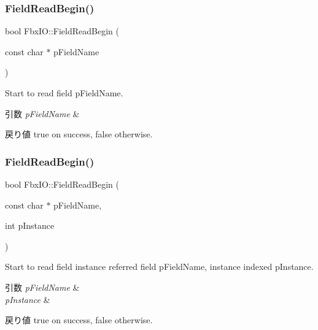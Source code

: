 \subsubsection{\texorpdfstring{Field\+Read\+Begin()}{FieldReadBegin()}\hspace{0.1cm}{\footnotesize\ttfamily [2/3]}}
{\footnotesize\ttfamily bool Fbx\+I\+O\+::\+Field\+Read\+Begin (\begin{DoxyParamCaption}\item[{const char $\ast$}]{p\+Field\+Name }\end{DoxyParamCaption})}

Start to read field p\+Field\+Name. 
\begin{DoxyParams}{引数}
{\em p\+Field\+Name} & \\
\hline
\end{DoxyParams}
\begin{DoxyReturn}{戻り値}
{\ttfamily true} on success, {\ttfamily false} otherwise. 
\end{DoxyReturn}
\mbox{\label{class_fbx_i_o_a5decc7ebf07bd318f3bc019e9c275a78}} 
\subsubsection{\texorpdfstring{Field\+Read\+Begin()}{FieldReadBegin()}\hspace{0.1cm}{\footnotesize\ttfamily [3/3]}}
{\footnotesize\ttfamily bool Fbx\+I\+O\+::\+Field\+Read\+Begin (\begin{DoxyParamCaption}\item[{const char $\ast$}]{p\+Field\+Name,  }\item[{int}]{p\+Instance }\end{DoxyParamCaption})}

Start to read field instance referred field p\+Field\+Name, instance indexed p\+Instance. 
\begin{DoxyParams}{引数}
{\em p\+Field\+Name} & \\
\hline
{\em p\+Instance} & \\
\hline
\end{DoxyParams}
\begin{DoxyReturn}{戻り値}
{\ttfamily true} on success, {\ttfamily false} otherwise. 
\end{DoxyReturn}
\mbox{\label{class_fbx_i_o_a870652de9c203f5524ad1cc259ad3665}} 
